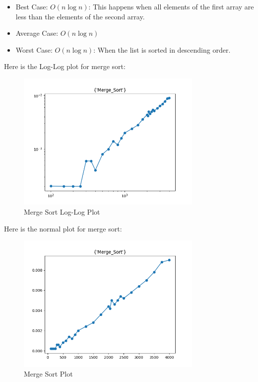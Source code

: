 \documentclass{article}
\begin{document}
\begin{itemize}
    \item Best Case: $O(n \log n)$: This happens when all elements of the first array are less than the elements of the second array.
    \item Average Case: $O(n \log n)$
    \item Worst Case: $O(n \log n)$: When the list is sorted in descending order. 
\end{itemize}

Here is the Log-Log plot for merge sort:
\begin{figure}[H]
    \centering
    \includegraphics*[width=0.8\textwidth]{img/loglog_Merge_Sort.png}
    \caption{Merge Sort Log-Log Plot}
\end{figure}

Here is the normal plot for merge sort:
\begin{figure}[H]
    \centering
    \includegraphics*[width=0.8\textwidth]{img/plot_Merge_Sort.png}
    \caption{Merge Sort Plot}
\end{figure}
\end{document}
